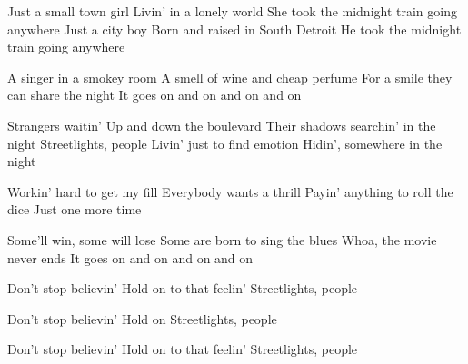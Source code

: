 \begin{verse*}
Just a small town girl
Livin' in a lonely world
She took the midnight train going anywhere
Just a city boy
Born and raised in South Detroit
He took the midnight train going anywhere
\end{verse*}

\begin{verse*}
A singer in a smokey room
A smell of wine and cheap perfume
For a smile they can share the night
It goes on and on and on and on
\end{verse*}

\begin{chorus}
Strangers waitin'
Up and down the boulevard
Their shadows searchin' in the night
Streetlights, people
Livin' just to find emotion
Hidin', somewhere in the night
\end{chorus}

\begin{verse*}
Workin' hard to get my fill
Everybody wants a thrill
Payin' anything to roll the dice
Just one more time
\end{verse*}

\begin{verse*}
Some'll win, some will lose
Some are born to sing the blues
Whoa, the movie never ends
It goes on and on and on and on
\end{verse*}

\thechorus

\begin{verse*}
Don't stop believin'
Hold on to that feelin'
Streetlights, people
\end{verse*}

\begin{verse*}
Don't stop believin'
Hold on
Streetlights, people
\end{verse*}

\begin{verse*}
Don't stop believin'
Hold on to that feelin'
Streetlights, people
\end{verse*}